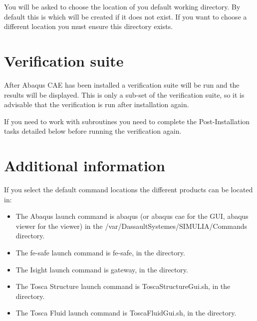 \documentclass[10pt,a4paper,oneside]{article}
\begin{document}
\begin{enumerate}
You will be asked to choose the location of you default working directory. By default this is \textbf{} which will be created if it does not exist. If you want to choose a different location you must ensure this directory  exists. 

\section{Verification suite}
After Abaqus CAE has been installed a verification suite will be run and the results will be displayed. This is only a sub-set of the verification suite, so it is advisable that the verification is run after installation again. 

If you need to work with subroutines you need to complete the Post-Installation tasks detailed below before running the verification again.


\end{enumerate}

\section{Additional information}
If you select the default command locations the different products can be located in:
\begin{itemize}
\item The Abaqus launch command is abaqus (or abaqus cae for the GUI, abaqus viewer for the viewer) in the /var/DassaultSystemes/SIMULIA/Commands directory.
\item The fe-safe launch command is fe-safe, in the  directory.
\item The Isight launch command is gateway, in the  directory.
\item The Tosca Structure launch command is ToscaStructureGui.sh, in the  directory.
\item The Tosca Fluid launch command is ToscaFluidGui.sh, in the  directory.
\end{itemize}
\end{document}
